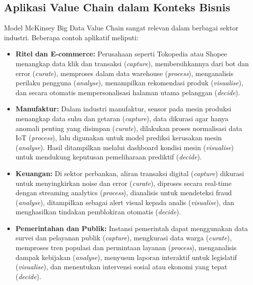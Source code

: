 \subsection{Aplikasi Value Chain dalam Konteks Bisnis}

Model McKinsey Big Data Value Chain sangat relevan dalam berbagai sektor industri. Beberapa contoh aplikatif meliputi:

\begin{itemize}
	\item \textbf{Ritel dan E-commerce:} Perusahaan seperti Tokopedia atau Shopee menangkap data klik dan transaksi (\textit{capture}), membersihkannya dari bot dan error (\textit{curate}), memproses dalam data warehouse (\textit{process}), menganalisis perilaku pengguna (\textit{analyse}), menampilkan rekomendasi produk (\textit{visualise}), dan secara otomatis mempersonalisasi halaman utama pelanggan (\textit{decide}).
	
	\item \textbf{Manufaktur:} Dalam industri manufaktur, sensor pada mesin produksi menangkap data suhu dan getaran (\textit{capture}), data dikurasi agar hanya anomali penting yang disimpan (\textit{curate}), dilakukan proses normalisasi data IoT (\textit{process}), lalu digunakan untuk model prediksi kerusakan mesin (\textit{analyse}). Hasil ditampilkan melalui dashboard kondisi mesin (\textit{visualise}) untuk mendukung keputusan pemeliharaan prediktif (\textit{decide}).
	
	\item \textbf{Keuangan:} Di sektor perbankan, aliran transaksi digital (\textit{capture}) dikurasi untuk menyingkirkan noise dan error (\textit{curate}), diproses secara real-time dengan streaming analytics (\textit{process}), dianalisis untuk mendeteksi fraud (\textit{analyse}), ditampilkan sebagai alert visual kepada analis (\textit{visualise}), dan menghasilkan tindakan pemblokiran otomatis (\textit{decide}).
	
	\item \textbf{Pemerintahan dan Publik:} Instansi pemerintah dapat menggunakan data survei dan pelayanan publik (\textit{capture}), mengkurasi data warga (\textit{curate}), memproses tren populasi dan permintaan layanan (\textit{process}), menganalisis dampak kebijakan (\textit{analyse}), menyusun laporan interaktif untuk legislatif (\textit{visualise}), dan menentukan intervensi sosial atau ekonomi yang tepat (\textit{decide}).
\end{itemize}


